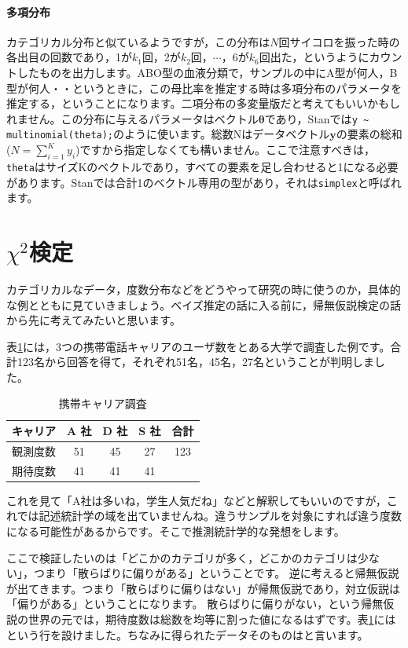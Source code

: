 \documentclass{ltjsbook}
\begin{document}
\paragraph{多項分布}
カテゴリカル分布と似ているようですが，この分布は$N$回サイコロを振った時の各出目の回数であり，1が$k_1$回，2が$k_2$回，$\cdots$，6が$k_6$回出た，というようにカウントしたものを出力します。ABO型の血液分類で，サンプルの中にA型が何人，B型が何人・・というときに，この母比率を推定する時は多項分布のパラメータを推定する，ということになります。二項分布の多変量版だと考えてもいいかもしれません\textcite{Matsuura201610}。この分布に与えるパラメータはベクトル$\bm{\theta}$であり，Stanでは\verb|y ~ multinomial(theta);|のように使います。総数Nはデータベクトル$\bm{y}$の要素の総和($N=\sum_{i=1}^K y_i$)ですから指定しなくても構いません。ここで注意すべきは，\verb|theta|はサイズKのベクトルであり，すべての要素を足し合わせると1になる必要があります。Stanでは合計1のベクトル専用の型があり，それは\verb|simplex|と呼ばれます。

\section{$\chi^2$検定}
カテゴリカルなデータ，度数分布などをどうやって研究の時に使うのか，具体的な例とともに見ていきましょう。ベイズ推定の話に入る前に，帰無仮説検定の話から先に考えてみたいと思います。

表\ref{tbl:10_01}には，3つの携帯電話キャリアのユーザ数をとある大学で調査した例です。合計123名から回答を得て，それぞれ51名，45名，27名ということが判明しました。
\begin{table}[ht]
	\centering
	\caption{携帯キャリア調査}
	\begin{tabular}{c|ccc|c}
		キャリア & A 社 & D 社 & S 社 & 合計  \\\hline
		観測度数 & 51  & 45  & 27  & 123 \\
		期待度数 & 41  & 41  & 41  &     \\
	\end{tabular}
	\label{tbl:10_01}
\end{table}
これを見て「A社は多いね，学生人気だね」などと解釈してもいいのですが，これでは記述統計学の域を出ていませんね。違うサンプルを対象にすれば違う度数になる可能性があるからです。そこで推測統計学的な発想をします。

ここで検証したいのは「どこかのカテゴリが多く，どこかのカテゴリは少ない」，つまり「散らばりに偏りがある」ということです。
逆に考えると帰無仮説が出てきます。つまり「散らばりに偏りはない」が帰無仮説であり，対立仮説は「偏りがある」ということになります。
散らばりに偏りがない，という帰無仮説の世界の元では，期待度数は総数を均等に割った値になるはずです。表\ref{tbl:10_01}にはという行を設けました。ちなみに得られたデータそのものはと言います。
\end{document}
